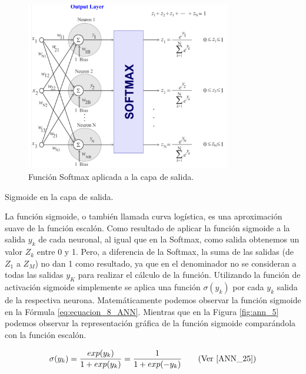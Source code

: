 \documentclass[12pt,a4paper]{article}
\makeatletter
\renewcommand\paragraph{\@startsection{paragraph}{4}{\z@}
            {-2.5ex\@plus -1ex \@minus -.25ex}
            {1.25ex \@plus .25ex}
            {\normalfont\normalsize\bfseries}}
\makeatother
\begin{document}
\begin{sloppypar}
\begin{figure}[H]    %
\centering
\includegraphics[width=0.8\textwidth]{images/ANN/4-ANN.png}
\caption[Función Softmax aplicada a la capa de salida.]{Función Softmax aplicada a la capa de salida\protect\footnotemark .}
 \label{fig:ann_4}
\end{figure}

\paragraph{Sigmoide en la capa de salida.}\label{sigm_capa_salida}

La función sigmoide, o también llamada curva logística, es una aproximación suave de la función escalón. Como resultado de aplicar la función sigmoide a la salida $y_k$ de cada neuronal, al igual que en la Softmax, como salida obtenemos un valor $Z_k$ entre 0 y 1. Pero, a diferencia de la Softmax, la suma de las salidas (de $Z_1$ a $Z_M$) no dan 1 como resultado, ya que en el denominador no se consideran a todas las salidas $y_K$ para realizar el cálculo de la función. Utilizando la función de activación sigmoide simplemente se aplica una función $\sigma(y_k)$ por cada $y_k$ salida de la respectiva neurona. Matemáticamente podemos observar la función sigmoide en la Fórmula \ref{eq:ecuacion_8_ANN}. 
Mientras que en la Figura \ref{fig:ann_5} podemos observar la representación gráfica de la función sigmoide comparándola con la función escalón. 

\begin{equation}\label{eq:ecuacion_8_ANN}
\sigma(y_k)= \frac{exp(y_k)}{ {1 + exp(y_k)}} =  \frac{1}{ {1+exp(-y_k)}}    \qquad \text{(Ver \cite{ANN_25})}
\end{equation}


\end{sloppypar}
\end{document}
